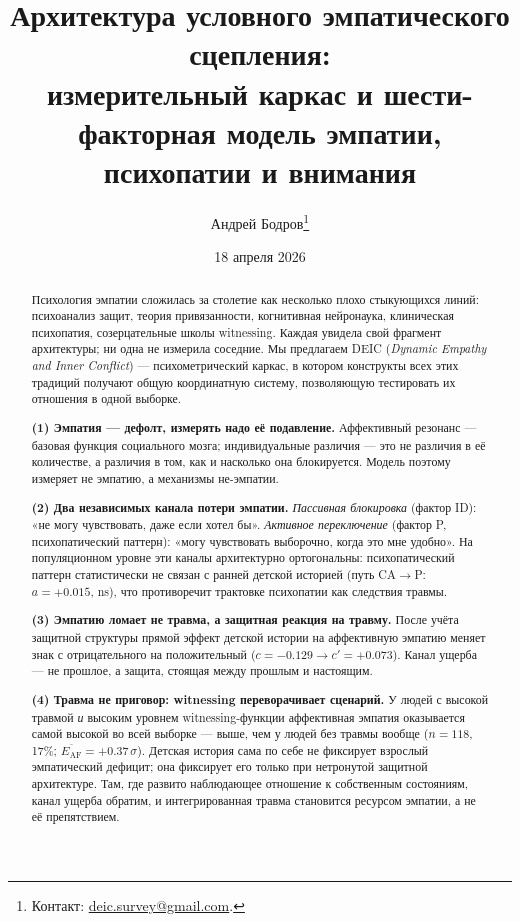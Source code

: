 \documentclass[11pt,a4paper]{article}
\title{Архитектура условного эмпатического сцепления:\\
\large измерительный каркас \DEIC{} и шести-факторная модель эмпатии, психопатии и внимания}
\author{Андрей Бодров\thanks{Контакт: \href{mailto:deic.survey@gmail.com}{deic.survey@gmail.com}.}}
\date{18 апреля 2026}
\newcommand{\DEIC}{DEIC}  %
\begin{document}
\maketitle

\begin{abstract}
\noindent
Психология эмпатии сложилась за столетие как несколько плохо стыкующихся линий: психоанализ защит, теория привязанности, когнитивная нейронаука, клиническая психопатия, созерцательные школы witnessing. Каждая увидела свой фрагмент архитектуры; ни одна не измерила соседние. Мы предлагаем \DEIC{} (\textit{Dynamic Empathy and Inner Conflict}) --- психометрический каркас, в котором конструкты всех этих традиций получают общую координатную систему, позволяющую тестировать их отношения в одной выборке.

\medskip
\noindent\textbf{(1) Эмпатия --- дефолт, измерять надо её подавление.} Аффективный резонанс --- базовая функция социального мозга; индивидуальные различия --- это не различия в её количестве, а различия в том, как и насколько она блокируется. Модель поэтому измеряет не эмпатию, а механизмы не-эмпатии.

\noindent\textbf{(2) Два независимых канала потери эмпатии.} \emph{Пассивная блокировка} (фактор ID): «не могу чувствовать, даже если хотел бы». \emph{Активное переключение} (фактор P, психопатический паттерн): «могу чувствовать выборочно, когда это мне удобно». На популяционном уровне эти каналы архитектурно ортогональны: психопатический паттерн статистически не связан с ранней детской историей (путь CA$\to$P: $a = +0.015$, ns), что противоречит трактовке психопатии как следствия травмы.

\noindent\textbf{(3) Эмпатию ломает не травма, а защитная реакция на травму.} После учёта защитной структуры прямой эффект детской истории на аффективную эмпатию меняет знак с отрицательного на положительный ($c = -0.129 \to c' = +0.073$). Канал ущерба --- не прошлое, а защита, стоящая между прошлым и настоящим.

\noindent\textbf{(4) Травма не приговор: witnessing переворачивает сценарий.} У людей с высокой травмой \emph{и} высоким уровнем witnessing-функции аффективная эмпатия оказывается самой высокой во всей выборке --- выше, чем у людей без травмы вообще ($n = 118$, 17\%; $\overline{E_{\mathrm{AF}}} = +0.37\,\sigma$). Детская история сама по себе не фиксирует взрослый эмпатический дефицит; она фиксирует его только при нетронутой защитной архитектуре. Там, где развито наблюдающее отношение к собственным состояниям, канал ущерба обратим, и интегрированная травма становится ресурсом эмпатии, а не её препятствием.


\end{abstract}
\end{document}
